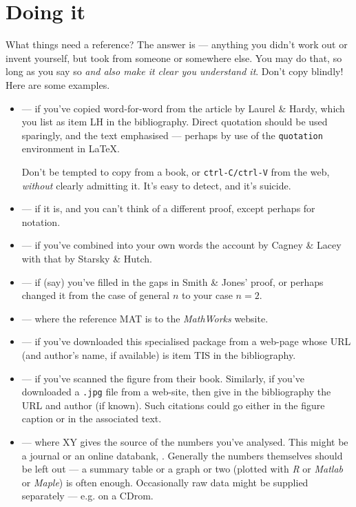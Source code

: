 \section{Doing it}
What things need a reference? The answer is --- anything you didn't work
out or invent yourself, but took from someone or somewhere else. You may
do that, so long as you say so \textit{and also make it clear you
understand it}. Don't copy blindly! Here are some
examples.\begin{itemize}
\item {} --- if you've
copied word-for-word from the article by Laurel \& Hardy, which you
list as item LH in the bibliography. Direct quotation should be used
sparingly, and the text emphasised --- perhaps by use of the
\texttt{quotation} environment in \LaTeX.\par
Don't be tempted to copy from a book, or \texttt{ctrl-C/ctrl-V} from the
web, \textit{without} clearly admitting it. It's easy to detect, and
it's suicide.
\item {} --- if it is, and you can't think of a different proof,
except perhaps for notation.
\item {} --- if you've combined into your own words the
account by Cagney \& Lacey with that by Starsky \& Hutch.
 \item {} ---
if (say) you've filled in the gaps in Smith \& Jones' proof, or perhaps
changed it from the case of general $n$ to your case $n=2$.
\item {} --- where the
reference MAT is to the \textsl{MathWorks} website.
\item {}
--- if you've downloaded this specialised package from a web-page whose
URL (and author's name, if available) is item TIS in the bibliography.
\item {}
--- if you've scanned the figure from their book. Similarly, if you've
downloaded a \texttt{.jpg} file from a web-site, then give in the
bibliography the URL and author (if known). Such citations could go
either in the figure caption or in the associated text.
\item {} --- where XY gives the
source of the numbers you've analysed. This might be a journal or
an online databank, \etc. Generally the numbers themselves should be
left out
--- a summary table or a graph or two (plotted with \textsl{R} or
\textsl{Matlab} or \textsl{Maple}) is often enough. Occasionally raw
data might be supplied separately --- e.g. on a CDrom.
\end{itemize}

